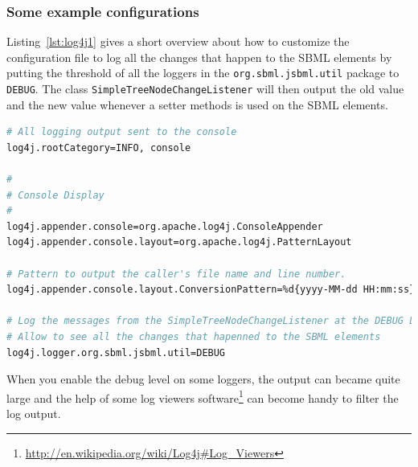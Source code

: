 \subsubsection{Some example configurations}
%

Listing~\vref{lst:log4j1} gives a short overview about how to
customize the configuration file to log all the changes that happen to the SBML
elements by putting the threshold of all the loggers in the
\texttt{org.sbml.jsbml.util} package to \texttt{DEBUG}. The class
\texttt{SimpleTreeNodeChangeListener}
%
will then output the old value and the new value whenever a setter methods is
used on the SBML elements.
\begin{lstlisting}[language=bash,%numbers=none,
caption={A simple log4j example.},label=lst:log4j1]
# All logging output sent to the console
log4j.rootCategory=INFO, console

#
# Console Display
#
log4j.appender.console=org.apache.log4j.ConsoleAppender
log4j.appender.console.layout=org.apache.log4j.PatternLayout

# Pattern to output the caller's file name and line number.
log4j.appender.console.layout.ConversionPattern=%d{yyyy-MM-dd HH:mm:ss} - %5p (%F:%L) - %m%n

# Log the messages from the SimpleTreeNodeChangeListener at the DEBUG Level
# Allow to see all the changes that hapenned to the SBML elements
log4j.logger.org.sbml.jsbml.util=DEBUG
\end{lstlisting}

When you enable the debug level
%
on some loggers, the output can became quite large and the help of some log
viewers software\footnote{\url{http://en.wikipedia.org/wiki/Log4j\#Log_Viewers}}
can become handy to filter the log output.

